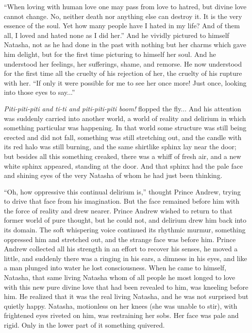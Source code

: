 ``When loving with human love one may pass from love to hatred,
but divine love cannot change. No, neither death nor anything
else can destroy it. It is the very essence of the soul. Yet how
many people have I hated in my life? And of them all, I loved and
hated none as I did her.'' And he vividly pictured to himself
Natasha, not as he had done in the past with nothing but her
charms which gave him delight, but for the first time picturing
to himself her soul. And he understood her feelings, her
sufferings, shame, and remorse. He now understood for the first
time all the cruelty of his rejection of her, the cruelty of his
rupture with her. ``If only it were possible for me to see her
once more!  Just once, looking into those eyes to say...''

\emph{Piti-piti-piti and ti-ti and piti-piti-piti boom!} flopped
the fly...  And his attention was suddenly carried into another
world, a world of reality and delirium in which something
particular was happening. In that world some structure was still
being erected and did not fall, something was still stretching
out, and the candle with its red halo was still burning, and the
same shirtlike sphinx lay near the door; but besides all this
something creaked, there was a whiff of fresh air, and a new
white sphinx appeared, standing at the door. And that sphinx had
the pale face and shining eyes of the very Natasha of whom he had
just been thinking.

``Oh, how oppressive this continual delirium is,'' thought Prince
Andrew, trying to drive that face from his imagination. But the
face remained before him with the force of reality and drew
nearer. Prince Andrew wished to return to that former world of
pure thought, but he could not, and delirium drew him back into
its domain. The soft whispering voice continued its rhythmic
murmur, something oppressed him and stretched out, and the
strange face was before him. Prince Andrew collected all his
strength in an effort to recover his senses, he moved a little,
and suddenly there was a ringing in his ears, a dimness in his
eyes, and like a man plunged into water he lost
consciousness. When he came to himself, Natasha, that same living
Natasha whom of all people he most longed to love with this new
pure divine love that had been revealed to him, was kneeling
before him. He realized that it was the real living Natasha, and
he was not surprised but quietly happy. Natasha, motionless on
her knees (she was unable to stir), with frightened eyes riveted
on him, was restraining her sobs. Her face was pale and
rigid. Only in the lower part of it something quivered.

